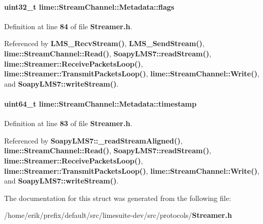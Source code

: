 \paragraph[{flags}]{\setlength{\rightskip}{0pt plus 5cm}uint32\+\_\+t lime\+::\+Stream\+Channel\+::\+Metadata\+::flags}\label{structlime_1_1StreamChannel_1_1Metadata_addb1e0ead5437a4bfd9e4f2f1252246e}


Definition at line {\bf 84} of file {\bf Streamer.\+h}.



Referenced by {\bf L\+M\+S\+\_\+\+Recv\+Stream()}, {\bf L\+M\+S\+\_\+\+Send\+Stream()}, {\bf lime\+::\+Stream\+Channel\+::\+Read()}, {\bf Soapy\+L\+M\+S7\+::read\+Stream()}, {\bf lime\+::\+Streamer\+::\+Receive\+Packets\+Loop()}, {\bf lime\+::\+Streamer\+::\+Transmit\+Packets\+Loop()}, {\bf lime\+::\+Stream\+Channel\+::\+Write()}, and {\bf Soapy\+L\+M\+S7\+::write\+Stream()}.

\paragraph[{timestamp}]{\setlength{\rightskip}{0pt plus 5cm}uint64\+\_\+t lime\+::\+Stream\+Channel\+::\+Metadata\+::timestamp}\label{structlime_1_1StreamChannel_1_1Metadata_add4c7efdc0015eb028fcb439029f1348}


Definition at line {\bf 83} of file {\bf Streamer.\+h}.



Referenced by {\bf Soapy\+L\+M\+S7\+::\+\_\+read\+Stream\+Aligned()}, {\bf lime\+::\+Stream\+Channel\+::\+Read()}, {\bf Soapy\+L\+M\+S7\+::read\+Stream()}, {\bf lime\+::\+Streamer\+::\+Receive\+Packets\+Loop()}, {\bf lime\+::\+Streamer\+::\+Transmit\+Packets\+Loop()}, {\bf lime\+::\+Stream\+Channel\+::\+Write()}, and {\bf Soapy\+L\+M\+S7\+::write\+Stream()}.



The documentation for this struct was generated from the following file\+:\begin{DoxyCompactItemize}
\item 
/home/erik/prefix/default/src/limesuite-\/dev/src/protocols/{\bf Streamer.\+h}\end{DoxyCompactItemize}
